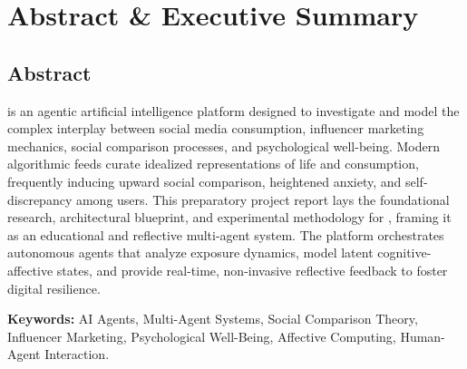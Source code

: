 \chapter*{Abstract \& Executive Summary}

\section*{Abstract}

\noindent
\projectname{} is an agentic artificial intelligence platform designed to investigate and model the complex interplay between social media consumption, influencer marketing mechanics, social comparison processes, and psychological well-being. Modern algorithmic feeds curate idealized representations of life and consumption, frequently inducing upward social comparison, heightened anxiety, and self-discrepancy among users. This preparatory project report lays the foundational research, architectural blueprint, and experimental methodology for \projectname{}, framing it as an educational and reflective multi-agent system. The platform orchestrates autonomous agents that analyze exposure dynamics, model latent cognitive-affective states, and provide real-time, non-invasive reflective feedback to foster digital resilience.

\vspace{0.8cm}
\noindent\textbf{Keywords:} AI Agents, Multi-Agent Systems, Social Comparison Theory, Influencer Marketing, Psychological Well-Being, Affective Computing, Human-Agent Interaction.

\vspace{1cm}

